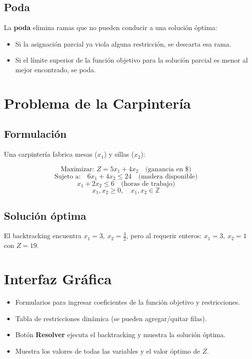 \documentclass[12pt,a4paper]{article}
\begin{document}
\subsection{Poda}
La \textbf{poda} elimina ramas que no pueden conducir a una solución óptima:
\begin{itemize}
  \item Si la asignación parcial ya viola alguna restricción, se descarta esa rama.
  \item Si el límite superior de la función objetivo para la solución parcial es menor al mejor encontrado, se poda.
\end{itemize}

\section{Problema de la Carpintería}

\subsection{Formulación}
Una carpintería fabrica mesas ($x_1$) y sillas ($x_2$):

\[
\text{Maximizar: } Z = 5x_1 + 4x_2 \quad \text{(ganancia en \$)}
\]
\[
\text{Sujeto a:}\quad
6x_1 + 4x_2 \leq 24 \quad \text{(madera disponible)}
\]
\[
x_1 + 2x_2 \leq 6 \quad \text{(horas de trabajo)}
\]
\[
x_1, x_2 \geq 0, \quad x_1, x_2 \in \mathbb{Z}
\]

\subsection{Solución óptima}
El backtracking encuentra $x_1 = 3,\ x_2 = \frac{3}{2}$, pero al requerir enteros: $x_1 = 3,\ x_2 = 1$ con $Z = 19$.

\section{Interfaz Gráfica}

\begin{itemize}
  \item Formularios para ingresar coeficientes de la función objetivo y restricciones.
  \item Tabla de restricciones dinámica (se pueden agregar/quitar filas).
  \item Botón \textbf{Resolver} ejecuta el backtracking y muestra la solución óptima.
  \item Muestra los valores de todas las variables y el valor óptimo de $Z$.
\end{itemize}
\end{document}
